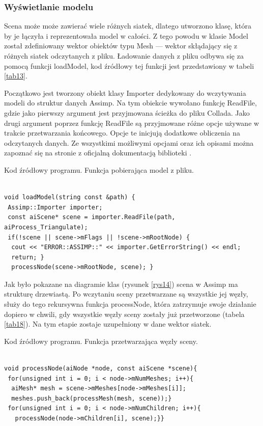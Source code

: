 \subsubsection{Wyświetlanie modelu}
Scena może może zawierać wiele różnych siatek, dlatego utworzono klasę, która by je łączyła i reprezentowała model w całości. Z tego powodu w klasie Model został zdefiniowany wektor obiektów typu Mesh --- wektor skłądający się z różnych siatek odczytanych z pliku. Ładowanie danych z pliku odbywa się za pomocą funkcji loadModel, kod źródłowy tej funkcji jest przedstawiony w tabeli \ref{tab13}.

Początkowo jest tworzony obiekt klasy Importer dedykowany do wczytywania modeli do struktur danych Assimp. Na tym obiekcie wywołano funkcję ReadFile, gdzie jako pierwszy argument jest przyjmowana ścieżka do pliku Collada. Jako drugi argument poprzez funkcję ReadFile są przyjmowane różne opcje używane w trakcie przetwarzania końcowego. Opcje te inicjują dodatkowe obliczenia na odczytanych danych. Ze wszystkimi możliwymi opcjami oraz ich opisami można zapoznać się na stronie z oficjalną dokumentacją biblioteki \cite{assimpDocumentation}.

\begin{table}[H]
\caption{Kod źródłowy programu. Funkcja pobierająca model z pliku.}
\label{tab13}
\begin{lstlisting}[frame=single]  % Start your code-block

void loadModel(string const &path) {
 Assimp::Importer importer;
 const aiScene* scene = importer.ReadFile(path, aiProcess_Triangulate);
 if(!scene || scene->mFlags || !scene->mRootNode) {
  cout << "ERROR::ASSIMP::" << importer.GetErrorString() << endl;
  return; }
  processNode(scene->mRootNode, scene); }
\end{lstlisting}
\end{table}

Jak było pokazane na diagramie klas (rysunek \ref{rys14}) scena w Assimp ma strukturę drzewiastą. Po wczytaniu sceny przetwarzane są wszystkie jej węzły, służy do tego rekursywna funkcja processNode, która zatrzymuje swoje działanie dopiero w chwili, gdy wszystkie węzły sceny zostały już przetworzone (tabela \ref{tab18}). Na tym etapie zostaje uzupełniony w dane wektor siatek.

\begin{table}[H]
\caption{Kod źródłowy programu. Funkcja przetwarzająca węzły sceny.}
\label{tab18}
\begin{lstlisting}[frame=single]  % Start your code-block

void processNode(aiNode *node, const aiScene *scene){
 for(unsigned int i = 0; i < node->mNumMeshes; i++){
  aiMesh* mesh = scene->mMeshes[node->mMeshes[i]];
  meshes.push_back(processMesh(mesh, scene));}
 for(unsigned int i = 0; i < node->mNumChildren; i++){
   processNode(node->mChildren[i], scene);}}
\end{lstlisting}
\end{table}

